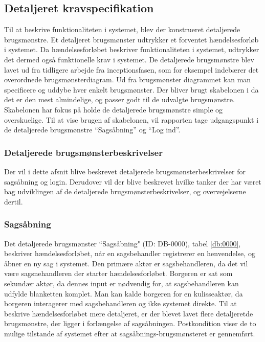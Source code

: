 \documentclass[../../main.tex]{subfiles}
\begin{document}
\subsection{Detaljeret kravspecifikation}
Til at beskrive funktionaliteten i systemet, blev der konstrueret detaljerede brugsmønstre. Et detaljeret brugsmønster udtrykker et forventet hændelsesforløb i systemet. Da hændelsesforløbet beskriver funktionaliteten i systemet, udtrykker det dermed også funktionelle krav i systemet.  De detaljerede brugsmønstre blev lavet ud fra tidligere arbejde fra inceptionsfasen, som for eksempel indebærer det overordnede brugsmønsterdiagram. Ud fra brugsmønster diagrammet kan man specificere og uddybe hver enkelt brugsmønster. Der bliver brugt skabelonen i \cite[s. 78]{arlow2005uml} da det er den mest almindelige, og passer godt til de udvalgte brugsmønstre. Skabelonen har fokus på holde de detaljerede brugsmønstre simple og overskuelige. Til at vise brugen af skabelonen, vil rapporten tage udgangspunkt i de detaljerede brugsmønstre “Sagsåbning” og “Log ind”.  


\subsubsection{Detaljerede brugsmønsterbeskrivelser}
Der vil i dette afsnit blive beskrevet detaljerede brugsmønsterbeskrivelser for sagsåbning og login. Derudover vil der blive beskrevet hvilke tanker der har været bag udviklingen af de detaljerede brugsmønsterbeskrivelser, og overvejelserne dertil.                    

\subsubsection{Sagsåbning} 
Det detaljerede brugsmønster “Sagsåbning" (ID: DB-0000), tabel \ref{db:0000}, beskriver hændelsesforløbet, når en sagsbehandler registrerer en henvendelse, og åbner en ny sag i systemet. Den primære aktør er sagsbehandleren, da det vil være sagsnehandleren der starter hændelsesforløbet.  
Borgeren er sat som sekundær aktør, da dennes input er nødvendig for, at sagsbehandleren kan udfylde blanketten komplet. Man kan kalde borgeren for en kulisseaktør, da borgeren interagerer med sagsbehandleren og ikke systemet direkte. Til at beskrive hændelsesforløbet mere detaljeret, er der blevet lavet flere detaljeretde brugsmønstre, der ligger  i forlængelse af sagsåbningen. Postkondition viser de to mulige tilstande af systemet efter at sagsåbnings-brugsmønsteret er gennemført. 
\end{document}
